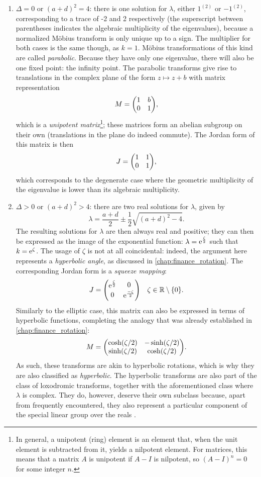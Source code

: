 \begin{enumerate}
\begin{enumerate}
        \end{enumerate}
    \item \(\Delta = 0\) or \((a + d)^2 = 4\): there is one solution for \(\lambda\), either \(1^{(2)}\) or \(-1^{(2)}\), corresponding to a trace of -2 and 2 respectively (the superscript between parentheses indicates the algebraic multiplicity of the eigenvalues), because a normalized Möbius transform is only unique up to a sign. The multiplier for both cases is the same though, as \(k = 1\). Möbius transformations of this kind are called \emph{parabolic}. Because they have only one eigenvalue, there will also be one fixed point: the infinity point. The parabolic transforms give rise to translations in the complex plane of the form \(z \mapsto z + b\) with matrix representation
    \[ M = \mqty(1 & b \\ 0 & 1 ), \]
    which is a \emph{unipotent matrix}\footnote{In general, a unipotent (ring) element is an element that, when the unit element is subtracted from it, yields a nilpotent element. For matrices, this means that a matrix \(A\) is unipotent if \(A - I\) is nilpotent, so \((A - I)^n = 0\) for some integer \(n\).}; these matrices form an abelian subgroup on their own (translations in the plane do indeed commute). The Jordan form of this matrix is then
    \[ J = \mqty( 1 & 1 \\ 0 & 1 ), \]
    which corresponds to the degenerate case where the geometric multiplicity of the eigenvalue is lower than its algebraic multiplicity.
    \item \(\Delta > 0\) or \((a + d)^2 > 4\): there are two real solutions for \(\lambda\), given by
        \[ \lambda = \frac{a + d}{2} \pm \frac{1}{2}\sqrt{(a + d)^2 - 4}. \]
        The resulting solutions for \(\lambda\) are then always real and positive; they can then be expressed as the image of the exponential function: \(\lambda = \mathrm{e}^{\frac{\zeta}{2}}\) such that \(k = \mathrm{e}^{\zeta}\). The usage of \(\zeta\) is not at all coincidental: indeed, the argument here represents a \emph{hyperbolic angle}, as discussed in \cref{chap:finance_rotation}. The corresponding Jordan form is a 
        \emph{squeeze mapping}:
        \[ J = \mqty(\dmat[0]{\ec^{\frac{\zeta}{2}}, \ec^{\frac{-\zeta}{2}}})
        \quad \zeta \in \real\setminus\qty{0}. \]
        Similarly to the elliptic case, this matrix can also be expressed in terms of hyperbolic functions, completing the analogy that was already established in \cref{chap:finance_rotation}:
        \[ M = \mqty(\cosh(\zeta/2) & -\sinh(\zeta/2)\\ 
                     \sinh(\zeta/2) & \cosh(\zeta/2)). \]
        As such, these transforms are akin to hyperbolic rotations, which is why they are also classified as \emph{hyperbolic}. The hyperbolic transforms are also part of the class of loxodromic transforms, together with the aforementioned class where \(\lambda\) is complex. They do, however, deserve their own subclass because, apart from frequently encountered, they also represent a particular component of the special linear group over the reals .
\end{enumerate}
